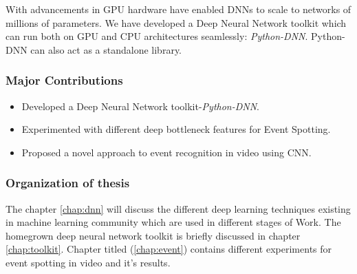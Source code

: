 With advancements in GPU hardware have enabled DNNs to scale to networks of millions of parameters. We have developed a Deep Neural Network toolkit which can run both on GPU and CPU architectures seamlessly: \textit{Python-DNN}. Python-DNN can also act as a standalone library.

\subsubsection{Major Contributions}
\begin{itemize}
\item Developed a Deep Neural Network toolkit-\textit{Python-DNN}. 
\item Experimented with different deep bottleneck features for Event Spotting.
\item Proposed a novel approach to event recognition in video using CNN.
\end{itemize}

\subsubsection{Organization of thesis}
The chapter \ref{chap:dnn} will discuss the different deep learning techniques existing in machine learning community which are used in different stages of Work. The homegrown deep neural network toolkit is briefly discussed in chapter \ref{chap:toolkit}. Chapter titled  (\ref{chap:event}) contains different experiments for event spotting in video and it's results.
